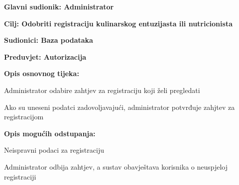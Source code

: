				\noindent {}
					\begin{packed_item}
	
						\item \textbf{Glavni sudionik: Administrator}
						\item  \textbf{Cilj: Odobriti registraciju kulinarskog entuzijasta ili nutricionista}
						\item  \textbf{Sudionici: Baza podataka}
						\item  \textbf{Preduvjet: Autorizacija} 
						\item  \textbf{Opis osnovnog tijeka:}
						
						\item[] \begin{packed_enum}
	
							\item Administrator odabire zahtjev za registraciju koji želi pregledati
					
							\item Ako su uneseni podatci zadovoljavajući, administrator potvrđuje zahjtev za registracijom
						\end{packed_enum}
						
						\item  \textbf{Opis mogućih odstupanja:}
						
						\item[] \begin{packed_item}
	
							\item[1.a] Neispravni podaci za registraciju
							\item[] \begin{packed_enum}
								
								\item Administrator odbija zahtjev, a sustav obavještava korisnika o neuspjeloj registraciji
							\end{packed_enum}
						\end{packed_item}
					\end{packed_item}
					
